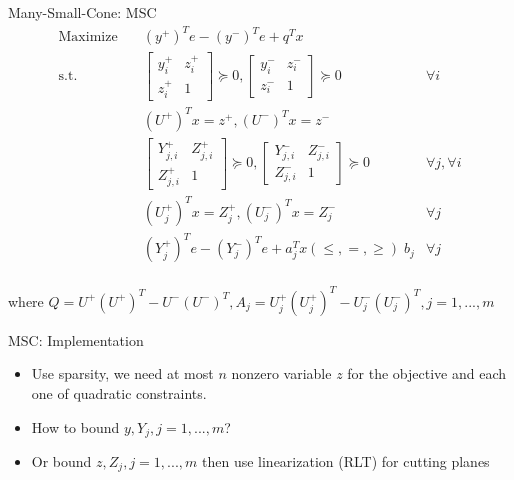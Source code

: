 \begin{frame}{Many-Small-Cone: MSC}
  \begin{equation}
    \begin{aligned}
      \mathrm{Maximize}\quad              & (y^+)^Te - (y^-)^Te + q^Tx                                        \\
      \mathrm{s.t.} \quad                 & \begin{bmatrix}y^+_i & z^+_i \\ z^+_i & 1 \end{bmatrix} \succeq 0,
      \begin{bmatrix}y^-_i & z^-_i \\ z^-_i & 1 \end{bmatrix} \succeq 0 & \forall i                                                         \\
                                          & (U^+)^Tx = z^+, (U^-)^Tx = z^-                                    \\
                                          & \begin{bmatrix}Y^+_{j, i} & Z^+_{j, i}\\ Z^+_{j, i} & 1 \end{bmatrix} \succeq 0,
      \begin{bmatrix} Y^-_{j, i} & Z^-_{j, i} \\ Z^-_{j, i} & 1 \end{bmatrix} \succeq 0 & \forall j, \forall i                                              \\
                                          & (U^+_j)^Tx = Z^+_j, (U^-_j)^Tx = Z^-_j                & \forall j \\
                                          & (Y^+_j)^Te - (Y^-_j)^Te + a_j^Tx (\le, =, \ge) \; b_j & \forall j \\
    \end{aligned}
  \end{equation}

  where \(Q =  U^+ (U^+)^T - U^- (U^-)^T, A_j = U^+_j (U^+_j)^T - U^-_j (U^-_j)^T, j = 1,...,m\)
\end{frame}
\begin{frame}{MSC: Implementation}
  \begin{itemize}
    \item Use sparsity, we need at most \(n\) nonzero variable \(z\) for the objective and each one of quadratic constraints.
    \item How to bound \(y, Y_j, j = 1,...,m\)?
    \item Or bound \(z, Z_j, j = 1,...,m\) then use linearization (RLT) for cutting planes
  \end{itemize}
\end{frame}

